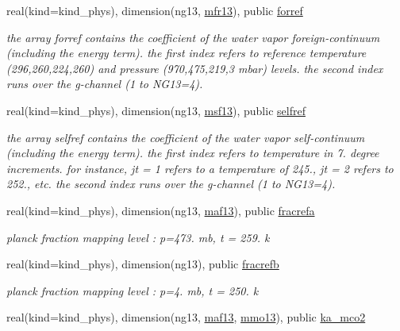 \begin{Indent}
\begin{DoxyCompactItemize}
real(kind=kind\+\_\+phys), dimension(ng13, \hyperlink{group__module__radlw__kgbnn_ga158782c955af9f50aaefea2d49af97ce}{mfr13}), public \hyperlink{group__module__radlw__kgbnn_ga93c6546ef5f8cbfc4f63de29e1ba2452}{forref}
\begin{DoxyCompactList}\small\item\em the array forref contains the coefficient of the water vapor foreign-\/continuum (including the energy term). the first index refers to reference temperature (296,260,224,260) and pressure (970,475,219,3 mbar) levels. the second index runs over the g-\/channel (1 to N\+G13=4). \end{DoxyCompactList}\item 
real(kind=kind\+\_\+phys), dimension(ng13, \hyperlink{group__module__radlw__kgbnn_ga7f88590d2a9fc392b04e89fd3d4bf2bf}{msf13}), public \hyperlink{group__module__radlw__kgbnn_gac8f58bba6aa4b72ffd01f78e60d0831f}{selfref}
\begin{DoxyCompactList}\small\item\em the array selfref contains the coefficient of the water vapor self-\/continuum (including the energy term). the first index refers to temperature in 7. degree increments. for instance, jt = 1 refers to a temperature of 245., jt = 2 refers to 252., etc. the second index runs over the g-\/channel (1 to N\+G13=4). \end{DoxyCompactList}\item 
real(kind=kind\+\_\+phys), dimension(ng13, \hyperlink{group__module__radlw__kgbnn_ga1ddc025df872b12194b8c6344cc0204e}{maf13}), public \hyperlink{group__module__radlw__kgbnn_ga82aed8a05cd528b287e336f7ff8fcebb}{fracrefa}
\begin{DoxyCompactList}\small\item\em planck fraction mapping level \+: p=473. mb, t = 259. k \end{DoxyCompactList}\item 
real(kind=kind\+\_\+phys), dimension(ng13), public \hyperlink{group__module__radlw__kgbnn_ga92d45aee9dab62549ea8821eae7422dd}{fracrefb}
\begin{DoxyCompactList}\small\item\em planck fraction mapping level \+: p=4. mb, t = 250. k \end{DoxyCompactList}\item 
real(kind=kind\+\_\+phys), dimension(ng13, \hyperlink{group__module__radlw__kgbnn_ga1ddc025df872b12194b8c6344cc0204e}{maf13}, \hyperlink{group__module__radlw__kgbnn_gae513ce55829a57a0dbda77f570e4a619}{mmo13}), public \hyperlink{group__module__radlw__kgbnn_ga523a0bc861ea861869f59b7bd007ff50}{ka\+\_\+mco2}

\end{DoxyCompactItemize}
\end{Indent}
